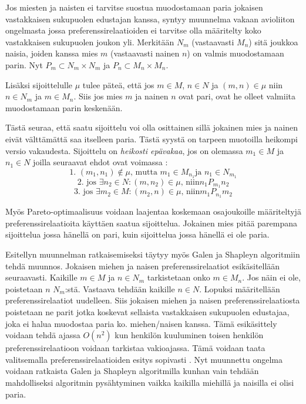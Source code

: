 \documentclass[gradu, twoside]{tktltiki}
\begin{document}
Jos miesten ja naisten ei tarvitse suostua muodostamaan paria jokaisen
vastakkaisen sukupuolen edustajan kanssa, syntyy muunnelma vakaan
avioliiton ongelmasta jossa preferenssirelaatioiden ei tarvitse olla
määritelty koko vastakkaisen sukupuolen joukon yli. Merkitään $N_m$
(vastaavasti $M_n$) sitä joukkoa naisia, joiden kanssa mies $m$
(vastaavasti nainen $n$) on valmis muodostamaan parin. Nyt $P_m
\subset N_m \times N_m$ ja $P_n \subset M_n \times M_n$.

 Lisäksi sijoittelulle $\mu$ tulee päteä, että jos $m \in M$, $n \in
 N$ ja $(m, n) \in \mu$ niin $n \in N_m$ ja $m \in M_n$. Siis jos mies
 $m$ ja nainen $n$ ovat pari, ovat he olleet valmiita muodostamaan
 parin keskenään.

Tästä seuraa, että saatu sijoittelu voi olla osittainen sillä jokainen
mies ja nainen eivät välttämättä saa itselleen paria. Tästä syystä on
tarpeen muotoilla heikompi versio vakaudesta. Sijoittelu on
\emph{heikosti epävakaa}, jos on olemassa $m_1 \in M$ ja $n_1 \in N$
joilla seuraavat ehdot ovat voimassa \cite{gusfield89}:
\[
\text{1. }(m_1, n_1) \notin \mu \text{, mutta } m_1 \in M_{n_1} \text{
  ja } n_1 \in N_{m_1}
\]
\[
\text{2. jos }\exists n_2 \in N: (m, n_2) \in \mu \text{, niin
}n_1P_{m_1}n_2
\]
\[
\text{3. jos }\exists m_2 \in M: (m_2, n) \in \mu \text{, niin
}m_1P_{n_1}m_2
\]

Myös Pareto-optimaalisuus voidaan laajentaa koskemaan osajoukoille
määriteltyjä preferenssirelaatioita käyttäen saatua sijoittelua.
Jokainen mies pitää parempana sijoittelua jossa hänellä on pari, kuin
sijoittelua jossa hänellä ei ole paria. \cite{gusfield89}

Esitellyn muunnelman ratkaisemiseksi täytyy myös Galen ja Shapleyn
algoritmiin tehdä muunnos. Jokaisen miehen ja naisen
preferenssirelaatiot esikäsitellään seuraavasti. Kaikille $m \in M$ ja
$n \in N_m$ tarkistetaan onko $m \in M_{n}$. Jos näin ei ole,
poistetaan $n$ $N_m$:stä. \cite{gusfield89} Vastaava tehdään kaikille
$n \in N$. Lopuksi määritellään preferenssirelaatiot uudelleen. Siis
jokaisen miehen ja naisen preferenssirelaatiosta poistetaan ne parit
jotka koskevat sellaista vastakkaisen sukupuolen edustajaa, joka ei
halua muodostaa paria ko. miehen\slash naisen kanssa. Tämä esikäsittely
voidaan tehdä ajassa $O(n^2)$ kun henkilön kuuluminen toisen henkilön
preferenssirelaatioon voidaan tarkistaa vakioajassa. Tämä voidaan
taata valitsemalla preferenssirelaatioiden esitys sopivasti
\cite{gusfield89}. Nyt muunnettu ongelma voidaan ratkaista Galen ja
Shapleyn algoritmilla kunhan vain tehdään mahdolliseksi algoritmin
pysähtyminen vaikka kaikilla miehillä ja naisilla ei olisi paria.
\end{document}
